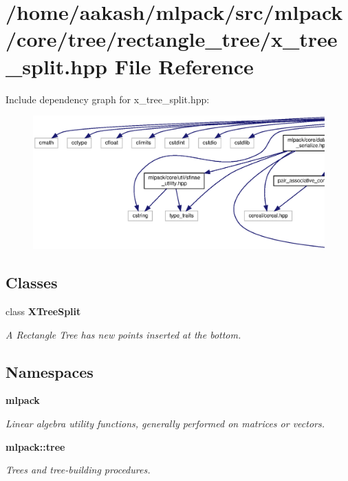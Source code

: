 \section{/home/aakash/mlpack/src/mlpack/core/tree/rectangle\+\_\+tree/x\+\_\+tree\+\_\+split.hpp File Reference}
\label{x__tree__split_8hpp}
Include dependency graph for x\+\_\+tree\+\_\+split.\+hpp\+:
\nopagebreak
\begin{figure}[H]
\begin{center}
\leavevmode
\includegraphics[width=350pt]{x__tree__split_8hpp__incl}
\end{center}
\end{figure}
\subsection*{Classes}
\begin{DoxyCompactItemize}
\item 
class \textbf{ X\+Tree\+Split}
\begin{DoxyCompactList}\small\item\em A Rectangle Tree has new points inserted at the bottom. \end{DoxyCompactList}\end{DoxyCompactItemize}
\subsection*{Namespaces}
\begin{DoxyCompactItemize}
\item 
 \textbf{ mlpack}
\begin{DoxyCompactList}\small\item\em Linear algebra utility functions, generally performed on matrices or vectors. \end{DoxyCompactList}\item 
 \textbf{ mlpack\+::tree}
\begin{DoxyCompactList}\small\item\em Trees and tree-\/building procedures. \end{DoxyCompactList}\end{DoxyCompactItemize}
